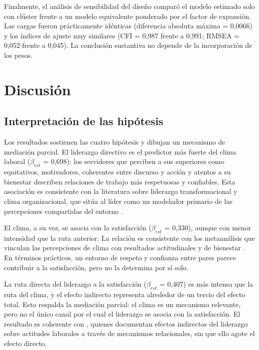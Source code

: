 \documentclass[11pt,a4paper]{article}
\begin{document}
Finalmente, el análisis de sensibilidad del diseño comparó el modelo estimado solo con
clúster frente a un modelo equivalente ponderado por el factor de expansión. Las cargas
fueron prácticamente idénticas (diferencia absoluta máxima = 0,0066) y los índices de ajuste
muy similares (CFI = 0,987 frente a 0,991; RMSEA = 0,052 frente a 0,045). La conclusión
sustantiva no depende de la incorporación de los pesos.

\section{Discusión}\label{sec:discusion}

\subsection{Interpretación de las hipótesis}

Los resultados sostienen las cuatro hipótesis y dibujan un mecanismo de mediación parcial.
El liderazgo directivo es el predictor más fuerte del clima laboral ($\beta_{est}$ = 0,698):
los servidores que perciben a sus superiores como equitativos, motivadores, coherentes entre
discurso y acción y atentos a su bienestar describen relaciones de trabajo más respetuosas y
confiables. Esta asociación es consistente con la literatura sobre liderazgo
transformacional y clima organizacional, que sitúa al líder como un modelador primario de las
percepciones compartidas del entorno \citep{avolio2004,schneider2013}.

El clima, a su vez, se asocia con la satisfacción ($\beta_{est}$ = 0,330), aunque con menor
intensidad que la ruta anterior. La relación es consistente con los metaanálisis que vinculan
las percepciones de clima con resultados actitudinales y de bienestar
\citep{carr2003,parker2003}. En términos prácticos, un entorno de respeto y confianza entre
pares parece contribuir a la satisfacción, pero no la determina por sí solo.

La ruta directa del liderazgo a la satisfacción ($\beta_{est}$ = 0,407) es más intensa que la
ruta del clima, y el efecto indirecto representa alrededor de un tercio del efecto total.
Esto respalda la mediación parcial: el clima es un mecanismo relevante, pero no el único
canal por el cual el liderazgo se asocia con la satisfacción. El resultado es coherente con
\citet{walumbwa2008}, quienes documentan efectos indirectos del liderazgo sobre actitudes
laborales a través de mecanismos relacionales, sin que ello agote el efecto directo.
\end{document}

